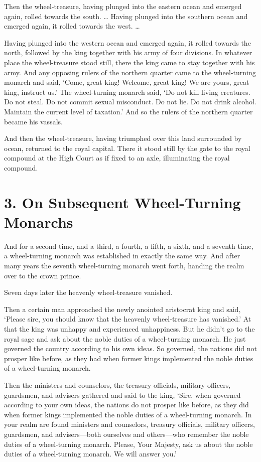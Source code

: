 \documentclass[12pt,openany]{book}%
\begin{document}
Then the wheel-treasure, having plunged into the eastern ocean and emerged again, rolled towards the south. … Having plunged into the southern ocean and emerged again, it rolled towards the west. … 

Having plunged into the western ocean and emerged again, it rolled towards the north, followed by the king together with his army of four divisions. In whatever place the wheel-treasure stood still, there the king came to stay together with his army. And any opposing rulers of the northern quarter came to the wheel-turning monarch and said, ‘Come, great king! Welcome, great king! We are yours, great king, instruct us.’ The wheel-turning monarch said, ‘Do not kill living creatures. Do not steal. Do not commit sexual misconduct. Do not lie. Do not drink alcohol. Maintain the current level of taxation.’ And so the rulers of the northern quarter became his vassals. 

And then the wheel-treasure, having triumphed over this land surrounded by ocean, returned to the royal capital. There it stood still by the gate to the royal compound at the High Court as if fixed to an axle, illuminating the royal compound. 

\section*{3. On Subsequent Wheel-Turning Monarchs }

And for a second time, and a third, a fourth, a fifth, a sixth, and a seventh time, a wheel-turning monarch was established in exactly the same way. And after many years the seventh wheel-turning monarch went forth, handing the realm over to the crown prince. 

Seven days later the heavenly wheel-treasure vanished. 

Then a certain man approached the newly anointed aristocrat king and said, ‘Please sire, you should know that the heavenly wheel-treasure has vanished.’ At that the king was unhappy and experienced unhappiness. But he didn’t go to the royal sage and ask about the noble duties of a wheel-turning monarch. He just governed the country according to his own ideas. So governed, the nations did not prosper like before, as they had when former kings implemented the noble duties of a wheel-turning monarch. 

Then the ministers and counselors, the treasury officials, military officers, guardsmen, and advisers gathered and said to the king, ‘Sire, when governed according to your own ideas, the nations do not prosper like before, as they did when former kings implemented the noble duties of a wheel-turning monarch. In your realm are found ministers and counselors, treasury officials, military officers, guardsmen, and advisers—both ourselves and others—who remember the noble duties of a wheel-turning monarch. Please, Your Majesty, ask us about the noble duties of a wheel-turning monarch. We will answer you.’ 
\end{document}
